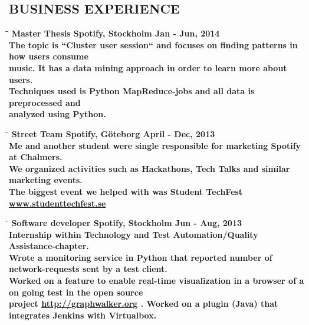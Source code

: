 \documentclass[11pt]{res}
\begin{document}
\begin{resume}
\section{BUSINESS EXPERIENCE}
\vspace{-0.1in}
\begin{tabbing}
 \hspace{2.3in}\= \hspace{2.6in}\= \kill %
 \bf {Master Thesis} \>Spotify, Stockholm \>Jan - Jun, 2014\\
	The topic is ``Cluster user session`` and focuses on finding patterns in how users consume \\ music. 
	It has a data mining approach in order to learn more about users. \\ 
	Techniques used is Python MapReduce-jobs and all data is preprocessed and \\ analyzed using Python.
\end{tabbing}
\vspace{-30pt}
\begin{tabbing}
 \hspace{2.3in}\= \hspace{2.6in}\= \kill %
 \bf {Street Team} \>Spotify, Göteborg \>April - Dec, 2013\\
	Me and another student were single responsible for marketing Spotify at Chalmers. \\ We organized activities such as Hackathons, Tech Talks and similar marketing events. \\
	The biggest event we helped with was Student TechFest \url{www.studenttechfest.se}
\end{tabbing}
\vspace{-30pt}
\begin{tabbing}
 \hspace{2.3in}\= \hspace{2.6in}\= \kill %
 \bf {Software developer} \>Spotify, Stockholm \> Jun - Aug, 2013\\
Internship within Technology and Test Automation/Quality Assistance-chapter.\\
Wrote a monitoring service in Python that reported number of network-requests sent by a test client. \\
Worked on a feature to enable real-time visualization in a browser of a on going test in the open source \\ project \url{http://graphwalker.org}
. Worked on a plugin (Java) that integrates Jenkins with Virtualbox.


\end{tabbing}
\end{resume}
\end{document}
